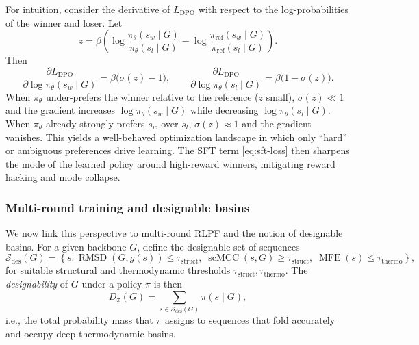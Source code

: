 {{For intuition, consider the derivative of $L_{\text{DPO}}$ with respect to
the log-probabilities of the winner and loser. Let
\begin{equation}
    z
    =
    \beta\left(
        \log\frac{\pi_\theta(s_w \mid G)}{\pi_\theta(s_l \mid G)}
        -
        \log\frac{\pi_{\text{ref}}(s_w \mid G)}{\pi_{\text{ref}}(s_l \mid G)}
    \right).
\end{equation}
Then
\begin{equation}
    \frac{\partial L_{\text{DPO}}}{\partial \log \pi_\theta(s_w \mid G)}
    =
    \beta \bigl(\sigma(z) - 1\bigr),
    \qquad
    \frac{\partial L_{\text{DPO}}}{\partial \log \pi_\theta(s_l \mid G)}
    =
    \beta \bigl(1 - \sigma(z)\bigr).
    \label{eq:dpo-grads}
\end{equation}
When $\pi_\theta$ under-prefers the winner relative to the reference
($z$ small), $\sigma(z) \ll 1$ and the gradient increases
$\log \pi_\theta(s_w \mid G)$ while decreasing $\log \pi_\theta(s_l \mid G)$.
When $\pi_\theta$ already strongly prefers $s_w$ over $s_l$, $\sigma(z)
\approx 1$ and the gradient vanishes. This yields a well-behaved optimization
landscape in which only ``hard'' or ambiguous preferences drive learning.
The SFT term \eqref{eq:sft-loss} then sharpens the mode of the learned
policy around high-reward winners, mitigating reward hacking and mode collapse.

\subsubsection{Multi-round training and designable basins}

We now link this perspective to multi-round RLPF and the notion of
designable basins. For a given backbone $G$, define the designable set of
sequences
\begin{equation}
    \mathcal{S}_{\text{des}}(G)
    =
    \left\{
        s :
        \operatorname{RMSD}(G, g(s)) \le \tau_{\text{struct}},
        \;
        \operatorname{scMCC}(s, G) \ge \tau_{\text{struct}},
        \;
        \operatorname{MFE}(s) \le \tau_{\text{thermo}}
    \right\},
    \label{eq:designable-set}
\end{equation}
for suitable structural and thermodynamic thresholds
$\tau_{\text{struct}}, \tau_{\text{thermo}}$.
The \emph{designability} of $G$ under a policy $\pi$ is then
\begin{equation}
    D_\pi(G)
    =
    \sum_{s \in \mathcal{S}_{\text{des}}(G)} \pi(s \mid G),
    \label{eq:designability}
\end{equation}
i.e., the total probability mass that $\pi$ assigns to sequences that fold
accurately and occupy deep thermodynamic basins.

}}
